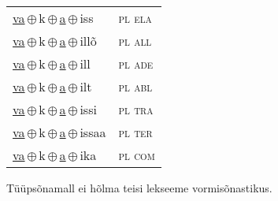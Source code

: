 \begin{minipage}{\textwidth}
\begin{sideways}
\begin{tabular}{l l}
\underline{va}\,$\oplus$\,k\,$\oplus$\,\underline{a}\,$\oplus$\,iss & \textsc{ pl ela } \\
\underline{va}\,$\oplus$\,k\,$\oplus$\,\underline{a}\,$\oplus$\,illõ & \textsc{ pl all } \\
\underline{va}\,$\oplus$\,k\,$\oplus$\,\underline{a}\,$\oplus$\,ill & \textsc{ pl ade } \\
\underline{va}\,$\oplus$\,k\,$\oplus$\,\underline{a}\,$\oplus$\,ilt & \textsc{ pl abl } \\
\underline{va}\,$\oplus$\,k\,$\oplus$\,\underline{a}\,$\oplus$\,issi & \textsc{ pl tra } \\
\underline{va}\,$\oplus$\,k\,$\oplus$\,\underline{a}\,$\oplus$\,issaa & \textsc{ pl ter } \\
\underline{va}\,$\oplus$\,k\,$\oplus$\,\underline{a}\,$\oplus$\,ika & \textsc{ pl com } \\
\end{tabular}
\end{sideways}
\label{tab:tüüpsõnamall-vaka}

\end{minipage}

 
\vspace{1em}
\noindent Tüüpsõnamall  ei hõlma teisi lekseeme vormi\-sõnastikus.
